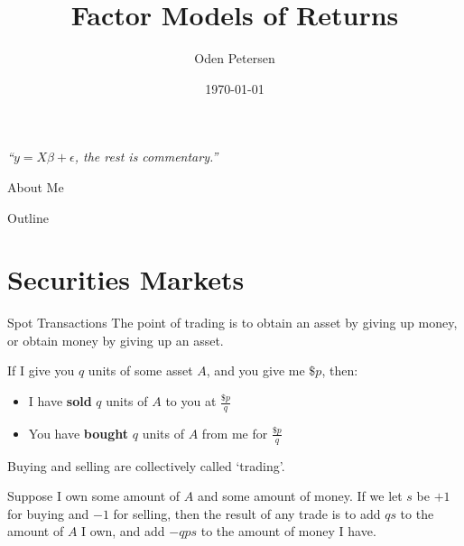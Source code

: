 \documentclass{beamer}
\title[Short Title]{Factor Models of Returns}
\author[Your Name]{Oden Petersen}
\date{\today}
\begin{document}
\begin{frame}
	\titlepage
	\begin{center}
		\textit{``$y=X\beta+\epsilon$, the rest is commentary.''}
	\end{center}
\end{frame}

\begin{frame}{About Me}
\end{frame}

\begin{frame}{Outline}
	\tableofcontents
\end{frame}

\section{Securities Markets}

\begin{frame}{Spot Transactions}
	The point of trading is to obtain an asset by giving up money, or obtain money by giving up an asset.

	If I give you $q$ units of some asset $A$, and you give me $\$p$, then:
	\begin{itemize}
		\item I have \textbf{sold} $q$ units of $A$ to you at $\frac{\$p}{q}$
		\item You have \textbf{bought} $q$ units of $A$ from me for $\frac{\$p}{q}$
	\end{itemize}

	Buying and selling are collectively called `trading'.

	Suppose I own some amount of $A$ and some amount of money. If we let $s$ be $+1$ for buying and $-1$ for selling, then the result of any trade is to add $qs$ to the amount of $A$ I own, and add $-qps$ to the amount of money I have. %

\end{frame}
\end{document}
